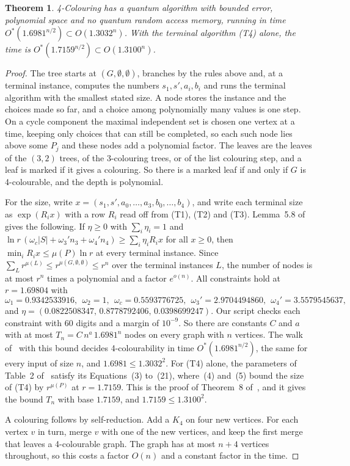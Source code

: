 \documentclass[11pt]{article}
\newtheorem{theorem}{Theorem}[section]
\theoremstyle{remark}
\begin{document}
\begin{theorem}\label{thm:four}
4-Colouring has a quantum algorithm with bounded error, polynomial space and no quantum random access memory, running in time $O^*(1.6981^{n/2}) \subset O(1.3032^n)$. With the terminal algorithm (T4) alone, the time is $O^*(1.7159^{n/2}) \subset O(1.3100^n)$.
\end{theorem}

\begin{proof}
The tree starts at $(G, \emptyset, \emptyset)$, branches by the rules above and, at a terminal instance, computes the numbers $s_1, s', a_i, b_i$ and runs the terminal algorithm with the smallest stated size. A node stores the instance and the choices made so far, and a choice among polynomially many values is one step. On a cycle component the maximal independent set is chosen one vertex at a time, keeping only choices that can still be completed, so each such node lies above some $P_j$ and these nodes add a polynomial factor. The leaves are the leaves of the $(3,2)$ trees, of the 3-colouring trees, or of the list colouring step, and a leaf is marked if it gives a colouring. So there is a marked leaf if and only if $G$ is 4-colourable, and the depth is polynomial.

For the size, write $x = (s_1, s', a_0, \dots, a_3, b_0, \dots, b_4)$, and write each terminal size as $\exp(R_i x)$ with a row $R_i$ read off from (T1), (T2) and (T3). Lemma~5.8 of~\cite{YS26} gives the following. If $\eta \ge 0$ with $\sum_i \eta_i = 1$ and $\ln r\,(\omega_c |S| + \omega_3' n_3 + \omega_4' n_4) \ge \sum_i \eta_i R_i x$ for all $x \ge 0$, then $\min_i R_i x \le \mu(P)\ln r$ at every terminal instance. Since $\sum_L r^{\mu(L)} \le r^{\mu(G, \emptyset, \emptyset)} \le r^n$ over the terminal instances $L$, the number of nodes is at most $r^n$ times a polynomial and a factor $e^{o(n)}$. All constraints hold at $r = 1.69804$ with
\[
\omega_1 = 0.9342533916,\ \ \omega_2 = 1,\ \ \omega_c = 0.5593776725,\ \ \omega_3' = 2.9704494860,\ \ \omega_4' = 3.5579545637,
\]
and $\eta = (0.0822508347,\, 0.8778792406,\, 0.0398699247)$. Our script checks each constraint with 60 digits and a margin of $10^{-9}$. So there are constants $C$ and $a$ with at most $T_n = C\, n^a\, 1.6981^n$ nodes on every graph with $n$ vertices. The walk of~\cite{Mon18} with this bound decides 4-colourability in time $O^*(1.6981^{n/2})$, the same for every input of size $n$, and $1.6981 \le 1.3032^2$. For (T4) alone, the parameters of Table~2 of~\cite{WGJ24} satisfy its Equations~(3) to~(21), where~(4) and~(5) bound the size of (T4) by $r^{\mu(P)}$ at $r = 1.7159$. This is the proof of Theorem~8 of~\cite{WGJ24}, and it gives the bound $T_n$ with base $1.7159$, and $1.7159 \le 1.3100^2$.

A colouring follows by self-reduction. Add a $K_4$ on four new vertices. For each vertex $v$ in turn, merge $v$ with one of the new vertices, and keep the first merge that leaves a 4-colourable graph. The graph has at most $n + 4$ vertices throughout, so this costs a factor $O(n)$ and a constant factor in the time.
\end{proof}
\end{document}

